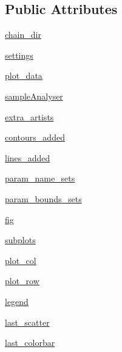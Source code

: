 \subsection*{Public Attributes}
\begin{DoxyCompactItemize}
\item 
\mbox{\hyperlink{classgetdist_1_1plots_1_1GetDistPlotter_a3bc2351d55e030f62382f5451d72f6dc}{chain\+\_\+dir}}
\item 
\mbox{\hyperlink{classgetdist_1_1plots_1_1GetDistPlotter_a6957d39a91cc48beffc359eae83aa214}{settings}}
\item 
\mbox{\hyperlink{classgetdist_1_1plots_1_1GetDistPlotter_ad66ca82b7ceada3d0534123ac7d9c9b0}{plot\+\_\+data}}
\item 
\mbox{\hyperlink{classgetdist_1_1plots_1_1GetDistPlotter_a54543d5a03405a48e98f2e362e076d38}{sample\+Analyser}}
\item 
\mbox{\hyperlink{classgetdist_1_1plots_1_1GetDistPlotter_abe4bfeba74e370efb5f917d93b6f29d7}{extra\+\_\+artists}}
\item 
\mbox{\hyperlink{classgetdist_1_1plots_1_1GetDistPlotter_a4804e7a414652e94c2068fcf37aa9a22}{contours\+\_\+added}}
\item 
\mbox{\hyperlink{classgetdist_1_1plots_1_1GetDistPlotter_a15cec9e6591043203af4eaee1563de93}{lines\+\_\+added}}
\item 
\mbox{\hyperlink{classgetdist_1_1plots_1_1GetDistPlotter_ac3d6a8fd5733360b19be6f1b51fb2bf5}{param\+\_\+name\+\_\+sets}}
\item 
\mbox{\hyperlink{classgetdist_1_1plots_1_1GetDistPlotter_a0328978f170538ac5d4e2546a0275d11}{param\+\_\+bounds\+\_\+sets}}
\item 
\mbox{\hyperlink{classgetdist_1_1plots_1_1GetDistPlotter_a30fb82076ac316341e377dffd32dacde}{fig}}
\item 
\mbox{\hyperlink{classgetdist_1_1plots_1_1GetDistPlotter_a0b8e4309cad0221a75a7debe7078729a}{subplots}}
\item 
\mbox{\hyperlink{classgetdist_1_1plots_1_1GetDistPlotter_a38321592270c7c25a09f85f18e5bdbf3}{plot\+\_\+col}}
\item 
\mbox{\hyperlink{classgetdist_1_1plots_1_1GetDistPlotter_ac0745694a94d98e3d169596c10d4e372}{plot\+\_\+row}}
\item 
\mbox{\hyperlink{classgetdist_1_1plots_1_1GetDistPlotter_af31518e8f85d144c2eac3034b8ba41a7}{legend}}
\item 
\mbox{\hyperlink{classgetdist_1_1plots_1_1GetDistPlotter_a16ae03a3c9df59a727cddf1d5043ed67}{last\+\_\+scatter}}
\item 
\mbox{\hyperlink{classgetdist_1_1plots_1_1GetDistPlotter_af51d48b35537e9a723ba8f3024e73ed2}{last\+\_\+colorbar}}
\end{DoxyCompactItemize}
